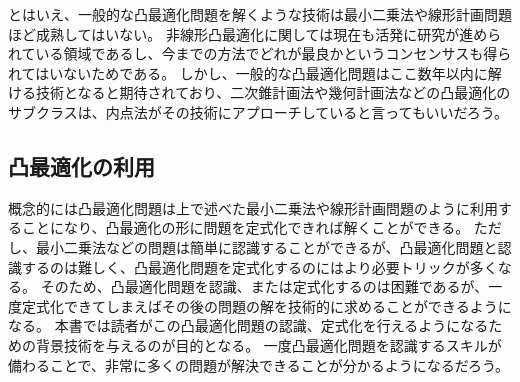 \documentclass[a4paper, 10pt, uplatex]{jsreport}
\begin{document}
とはいえ、一般的な凸最適化問題を解くような技術は最小二乗法や線形計画問題ほど成熟してはいない。
非線形凸最適化に関しては現在も活発に研究が進められている領域であるし、今までの方法でどれが最良かというコンセンサスも得られてはいないためである。
しかし、一般的な凸最適化問題はここ数年以内に解ける技術となると期待されており、二次錐計画法や幾何計画法などの凸最適化のサブクラスは、内点法がその技術にアプローチしていると言ってもいいだろう。

\subsection{凸最適化の利用}
概念的には凸最適化問題は上で述べた最小二乗法や線形計画問題のように利用することになり、凸最適化の形に問題を定式化できれば解くことができる。
ただし、最小二乗法などの問題は簡単に認識することができるが、凸最適化問題と認識するのは難しく、凸最適化問題を定式化するのにはより必要トリックが多くなる。
そのため、凸最適化問題を認識、または定式化するのは困難であるが、一度定式化できてしまえばその後の問題の解を技術的に求めることができるようになる。
本書では読者がこの凸最適化問題の認識、定式化を行えるようになるための背景技術を与えるのが目的となる。
一度凸最適化問題を認識するスキルが備わることで、非常に多くの問題が解決できることが分かるようになるだろう。
\end{document}

